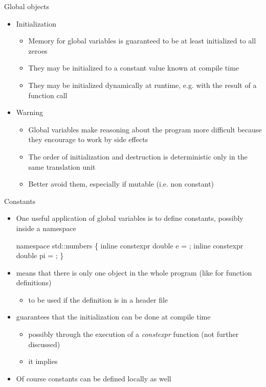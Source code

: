 \begin{frame}[fragile]{Global objects \insertcontinuationtext}
  \begin{itemize}
  \item<1-> Initialization
    \begin{itemize}
    \item Memory for global variables is guaranteed to be at least
      initialized to all zeroes
    \item They may be initialized to a constant value known at compile time
    \item They may be initialized dynamically at runtime, e.g. with the result
      of a function call
    \end{itemize}
  \item<2-> Warning
    \begin{itemize}
    \item Global variables make reasoning about the program more difficult
      because they encourage to work by side effects
    \item The order of initialization and destruction is deterministic only in
      the same translation unit
    \item \alert{Better avoid them}, especially if mutable (i.e. non constant)
    \end{itemize}
  \end{itemize}
\end{frame}

\begin{frame}[fragile]{Constants}

  \begin{itemize}
  \item One useful application of global variables is to define constants,
    possibly inside a namespace
    \begin{codeblock}{
namespace std::numbers \{
  inline constexpr double e  = \ddd ;
  inline constexpr double pi = \ddd ;
  \ddd
\}
}\end{codeblock}
    \item<2->  means that there is only one object in the whole
      program (like for function definitions)
      \begin{itemize}
      \item<2-> to be used if the definition is in a header file
      \end{itemize}
    \item<2->  guarantees that the initialization can be done at
      compile time
    \begin{itemize}
    \item<2-> possibly through the execution of a \textit{constexpr} function
      (not further discussed)
    \item<2-> it implies 
    \end{itemize}
  \item<3->Of course constants can be defined locally as well
  \end{itemize}

\end{frame}

